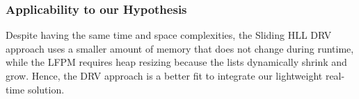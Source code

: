 \subsubsection*{Applicability to our Hypothesis}
Despite having the same time and space complexities, the Sliding HLL DRV approach uses a smaller amount of memory that does not change during runtime, while the LFPM requires heap resizing because the lists dynamically shrink and grow. Hence, the DRV approach is a better fit to integrate our lightweight real-time solution.




